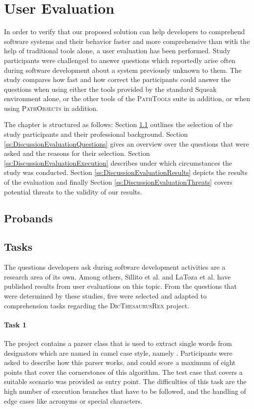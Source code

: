 \clearpage
\section{User Evaluation}
\label{s:DiscussionEvaluation}
In order to verify that our proposed solution can help developers to comprehend software systems and their behavior faster and more comprehensive than with the help of traditional tools alone, a user evaluation has been performed.
Study participants were challenged to answer questions which reportedly arise often during software development about a system previously unknown to them.
The study compares how fast and how correct the participants could answer the questions  when using either the tools provided by the standard Squeak environment alone, or the other tools of the \textsc{PathTools} suite in addition, or when using \textsc{PathObjects} in addition.

The chapter is structured as follows:
Section \ref{ss:DiscussionEvaluationParticipants} outlines the selection of the study participants and their professional background.
Section \ref{ss:DiscussionEvaluationQuestions} gives an overview over the questions that were asked and the reasons for their selection.
Section \ref{ss:DiscussionEvaluationExecution} describes under which circumstances the study was conducted.
Section \ref{ss:DiscussionEvaluationResults} depicts the results of the evaluation and finally Section \ref{ss:DiscussionEvaluationThreats} covers potential threats to the validity of our results.

\subsection{Probands}
\label{ss:DiscussionEvaluationParticipants}

\subsection{Tasks}
\label{ss:DiscussionEvaluationTasks}
The questions developers ask during software development activities are a research area of its own.
Among others, Sillito et al. and LaToza et al. have published results from user evaluations on this topic.
From the questions that were determined by these studies, five were selected and adapted to comprehension tasks regarding the \textsc{DicThesaurusRex} project.

\paragraph{Task 1} The project contains a parser class that is used to extract single words from designators which are named in camel case style, namely .
Participants were asked to describe how this parser works, and could score a maximum of eight points that cover the cornerstones of this algorithm.
The test case  that covers a suitable scenario was provided as entry point.
The difficulties of this task are the high number of execution branches that have to be followed, and the handling of edge cases like acronyms or special characters.

